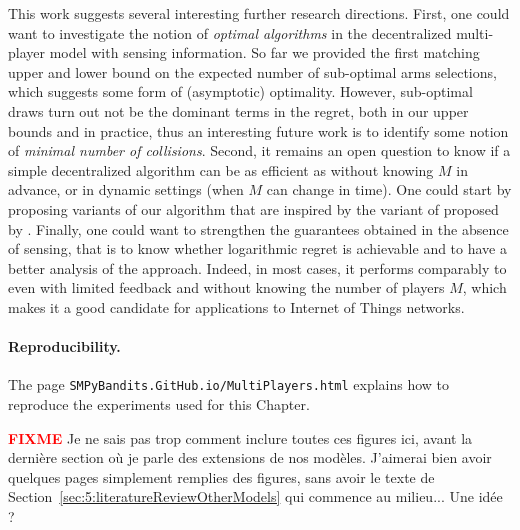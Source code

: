This work suggests several interesting further research directions.
First, one could want to investigate the notion of \emph{optimal algorithms} in the decentralized multi-player model with sensing information. So far we provided the first matching upper and lower bound on the expected number of sub-optimal arms selections, which suggests some form of (asymptotic) optimality. However, sub-optimal draws turn out not be the dominant terms in the regret, both in our upper bounds and in practice, thus an interesting future work is to identify some notion of \emph{minimal number of collisions}. Second, it remains an open question to know if a simple decentralized algorithm can be as efficient as \MCTopM{} without knowing $M$ in advance, or in dynamic settings (when $M$ can change in time). One could start by proposing variants of our algorithm that are inspired by the \rhoRandEst{} variant of \rhoRand{} proposed by \cite{Anandkumar11}.
Finally, one could want to strengthen the guarantees obtained in the absence of sensing, that is to know whether logarithmic regret is achievable and to have a better analysis of the \Selfish{} approach.  Indeed, in most cases, it performs comparably to \RandTopM{} even with limited feedback and without knowing the number of players $M$, which makes it a good candidate for applications to Internet of Things networks.





\paragraph{Reproducibility.}
The page \texttt{SMPyBandits.GitHub.io/MultiPlayers.html} explains how to reproduce the experiments used for this Chapter.

\begin{framed}
  \textcolor{red}{\textbf{FIXME}}
  Je ne sais pas trop comment inclure toutes ces figures ici, avant la dernière section où je parle des extensions de nos modèles.
  J'aimerai bien avoir quelques pages simplement remplies des figures, sans avoir le texte de Section~\ref{sec:5:literatureReviewOtherModels} qui commence au milieu...
  Une idée ?
\end{framed}
